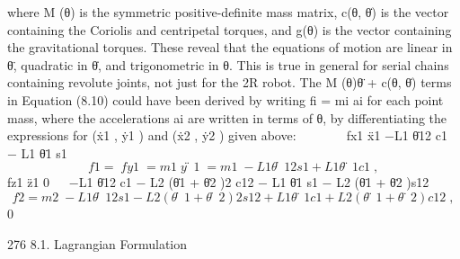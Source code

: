 \documentclass[12pt,a4paper]{article}
\begin{document}
where M (θ) is the symmetric positive-definite mass matrix, c(θ, θ̇) is the vector
containing the Coriolis and centripetal torques, and g(θ) is the vector containing
the gravitational torques. These reveal that the equations of motion are linear
in θ̈, quadratic in θ̇, and trigonometric in θ. This is true in general for serial
chains containing revolute joints, not just for the 2R robot.
    The M (θ)θ̈ + c(θ, θ̇) terms in Equation (8.10) could have been derived by
writing fi = mi ai for each point mass, where the accelerations ai are written
in terms of θ, by differentiating the expressions for (ẋ1 , ẏ1 ) and (ẋ2 , ẏ2 ) given
above:
                                                                   
           fx1               ẍ1                −L1 θ̇12 c1 − L1 θ̈1 s1
\begin{equation}
f1 =  fy1  = m1  ÿ1  = m1  −L1 θ̇12 s1 + L1 θ̈1 c1  ,
\label{eq:8.11}
\end{equation}
           fz1               z̈1                           0
                                                                                  
               −L1 θ̇12 c1 − L2 (θ̇1 + θ̇2 )2 c12 − L1 θ̈1 s1 − L2 (θ̈1 + θ̈2 )s12
\begin{equation}
f2 = m2  −L1 θ̇12 s1 − L2 (θ̇1 + θ̇2 )2 s12 + L1 θ̈1 c1 + L2 (θ̈1 + θ̈2 )c12  ,
\label{eq:8.12}
\end{equation}
                                                0


276                                                                 8.1. Lagrangian Formulation
\end{document}

